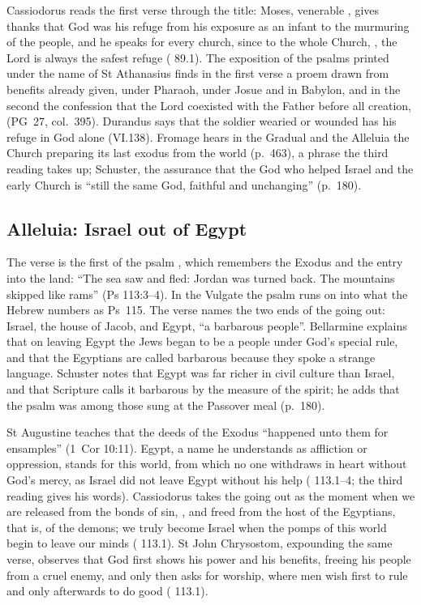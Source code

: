 Cassiodorus reads the first verse through the title: Moses, venerable
, gives thanks that God was his refuge from his
exposure as an infant to the murmuring of the people, and he speaks for every
church, since to the whole Church, , the Lord is always the safest refuge (
89.1). The exposition of the psalms printed under the name of St Athanasius
finds in the first verse a proem drawn from benefits already given, under
Pharaoh, under Josue and in Babylon, and in the second the confession that the
Lord coexisted with the Father before all creation,  (PG~27, col.~395). Durandus says that the soldier
wearied or wounded has his refuge in God alone (VI.138). Fromage hears in the
Gradual and the Alleluia the Church preparing its last exodus from the world
(p.~463), a phrase the third reading takes up; Schuster, the assurance that the God who helped Israel and
the early Church is ``still the same God, faithful and unchanging'' (p.~180).

\subsection{Alleluia: Israel out of Egypt}

The verse is the first of the psalm , which remembers the
Exodus and the entry into the land: ``The sea saw and fled: Jordan was turned
back. The mountains skipped like rams'' (Ps 113:3--4). In the Vulgate the psalm
runs on into what the Hebrew numbers as Ps~115. The verse names the two ends of
the going out: Israel, the house of Jacob, and Egypt, ``a barbarous people''.
Bellarmine explains that on leaving Egypt the Jews began to be a people under
God's special rule, and that the Egyptians are called barbarous because they
spoke a strange language. Schuster notes that Egypt was far richer in civil
culture than Israel, and that Scripture calls it barbarous by the measure of the
spirit; he adds that the psalm was among those sung at the Passover meal
(p.~180).

St Augustine teaches that the deeds of the Exodus ``happened unto them for
ensamples'' (1~Cor 10:11). Egypt, a name he understands as affliction or
oppression, stands for this world, from which no one withdraws in heart without
God's mercy, as Israel did not leave Egypt without his help (
113.1--4; the third reading gives his words). Cassiodorus takes the going out as the moment when we are released
from the bonds of sin, , and freed from the host of
the Egyptians, that is, of the demons; we truly become Israel when the pomps of
this world begin to leave our minds ( 113.1). St John
Chrysostom, expounding the same verse, observes that God first shows his power
and his benefits, freeing his people from a cruel enemy, and only then asks for
worship, where men wish first to rule and only afterwards to do good
( 113.1).

